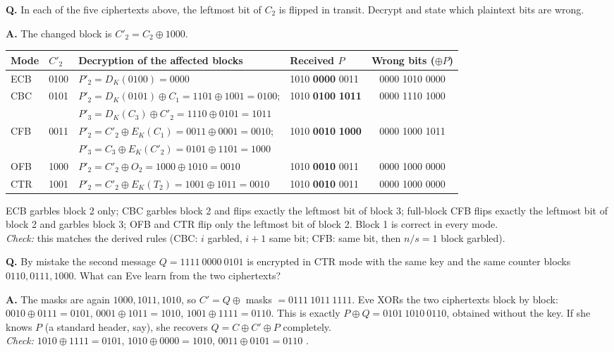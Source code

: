 \begin{worked}
\textbf{Q.} In each of the five ciphertexts above, the leftmost bit of $C_2$ is flipped in transit. Decrypt and state which plaintext bits are wrong.

\textbf{A.} The changed block is $C'_2 = C_2 \oplus 1000$.
\begin{center}\small
\begin{tabular}{@{}l l l l c@{}}
\toprule
Mode & $C'_2$ & Decryption of the affected blocks & Received $P$ & Wrong bits ($\oplus P$)\\
\midrule
ECB & 0100 & $P'_2 = D_K(0100) = 0000$ & 1010 \textbf{0000} 0011 & 0000 1010 0000\\
CBC & 0101 & $P'_2 = D_K(0101) \oplus C_1 = 1101 \oplus 1001 = 0100$; & 1010 \textbf{0100} \textbf{1011} & 0000 1110 1000\\
 & & $P'_3 = D_K(C_3) \oplus C'_2 = 1110 \oplus 0101 = 1011$ & & \\
CFB & 0011 & $P'_2 = C'_2 \oplus E_K(C_1) = 0011 \oplus 0001 = 0010$; & 1010 \textbf{0010} \textbf{1000} & 0000 1000 1011\\
 & & $P'_3 = C_3 \oplus E_K(C'_2) = 0101 \oplus 1101 = 1000$ & & \\
OFB & 1000 & $P'_2 = C'_2 \oplus O_2 = 1000 \oplus 1010 = 0010$ & 1010 \textbf{0010} 0011 & 0000 1000 0000\\
CTR & 1001 & $P'_2 = C'_2 \oplus E_K(T_2) = 1001 \oplus 1011 = 0010$ & 1010 \textbf{0010} 0011 & 0000 1000 0000\\
\bottomrule
\end{tabular}
\end{center}
ECB garbles block 2 only; CBC garbles block 2 and flips exactly the leftmost bit of block 3; full-block CFB flips exactly the leftmost bit of block 2 and garbles block 3; OFB and CTR flip only the leftmost bit of block 2. Block 1 is correct in every mode.\\
\emph{Check:} this matches the derived rules (CBC: $i$ garbled, $i+1$ same bit; CFB: same bit, then $n/s = 1$ block garbled).
\end{worked}

\begin{worked}
\textbf{Q.} By mistake the second message $Q = 1111\ 0000\ 0101$ is encrypted in CTR mode with the same key and the same counter blocks $0110, 0111, 1000$. What can Eve learn from the two ciphertexts?

\textbf{A.} The masks are again $1000, 1011, 1010$, so $C' = Q \oplus$ masks $= 0111\ 1011\ 1111$. Eve XORs the two ciphertexts block by block: $0010 \oplus 0111 = 0101$, $0001 \oplus 1011 = 1010$, $1001 \oplus 1111 = 0110$. This is exactly $P \oplus Q = 0101\ 1010\ 0110$, obtained without the key. If she knows $P$ (a standard header, say), she recovers $Q = C \oplus C' \oplus P$ completely.\\
\emph{Check:} $1010 \oplus 1111 = 0101$, $1010 \oplus 0000 = 1010$, $0011 \oplus 0101 = 0110$ \checkmark.
\end{worked}

